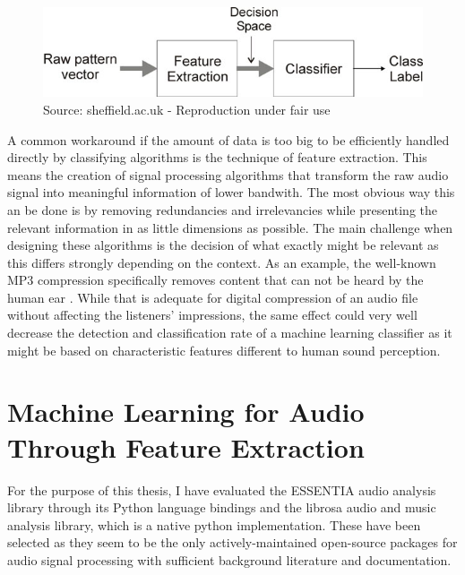 \begin{figure}[h]
    \centering
	\includegraphics[width=.8\textwidth]{./images/illustrations/pipeline-fe}
    \caption{Source: sheffield.ac.uk - Reproduction under fair use}
    \label{fig:pipeline-fe}
\end{figure}


A common workaround if the amount of data is too big to be efficiently handled directly by classifying algorithms is the technique of feature extraction. This means the creation of signal processing algorithms that transform the raw audio signal into meaningful information of lower bandwith. The most obvious way this an be done is by removing redundancies and irrelevancies while presenting the relevant information in as little dimensions as possible. The main challenge when designing these algorithms is the decision of what exactly might be relevant as this differs strongly depending on the context.
As an example, the well-known MP3 compression specifically removes content that can not be heard by the human ear \cite{brandenburg1999mp3}. While that is adequate for digital compression of an audio file without affecting the listeners' impressions, the same effect could very well decrease the detection and classification rate of a machine learning classifier as it might be based on characteristic features different to human sound perception.  


\section{Machine Learning for Audio Through Feature Extraction}







For the purpose of this thesis, I have evaluated the ESSENTIA audio analysis library \cite{bogdanov:Essentia:ACMMULTIMEDIA13} through its Python language bindings and the librosa audio and music analysis library\cite{BMcFee:librosa}, which is a native python implementation. 
These have been selected as they seem to be the only actively-maintained open-source packages for audio signal processing with sufficient background literature and documentation. 

